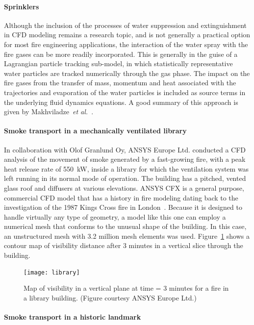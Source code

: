 \documentclass[graybox]{svmult}
\begin{document}
\paragraph{Sprinklers}

Although the inclusion of the processes of water suppression and extinguishment in CFD modeling remains a research topic, and is not generally a practical option for most fire engineering applications, the interaction of the water spray with the fire gases can be more readily incorporated. This is generally in the guise of a Lagrangian particle tracking sub-model, in which statistically representative water particles are tracked numerically through the gas phase. The impact on the fire gases from the transfer of mass, momentum and heat associated with the trajectories and evaporation of the water particles is included as source terms in the underlying fluid dynamics equations. A good summary of this approach is given by Makhviladze~{\em et al.}~\cite{Makhviladze}.


\paragraph{Smoke transport in a mechanically ventilated library}

In collaboration with Olof Granlund Oy, ANSYS Europe Ltd. conducted a CFD analysis of the movement of smoke generated by a fast-growing fire, with a peak heat release rate of 550~kW, inside a library for which the ventilation system was left running in its normal mode of operation. The building has a pitched, vented glass roof and diffusers at various elevations. ANSYS CFX is a general purpose, commercial CFD model that has a history in fire modeling dating back to the investigation of the 1987 Kings Cross fire in London~\cite{Simcox}. Because it is designed to handle virtually any type of geometry, a model like this one can employ a numerical mesh that conforms to the unusual shape of the building. In this case, an unstructured mesh with 3.2 million mesh elements was used. Figure~\ref{ANSYS} shows a contour map of visibility distance after 3 minutes in a vertical slice through the building.

\begin{figure}[ht]
\texttt{[image: library]}
\caption{Map of visibility in a vertical plane at time = 3 minutes for a fire in a library building. (Figure courtesy ANSYS Europe Ltd.)}
\label{ANSYS}
\end{figure}

\paragraph{Smoke transport in a historic landmark}
\end{document}
